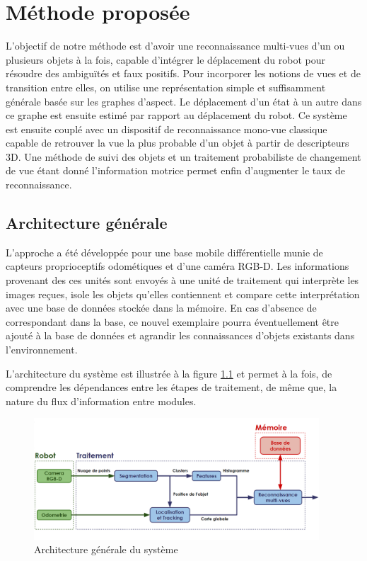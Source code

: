 
\chapter{Méthode proposée}

L'objectif de notre méthode est d'avoir une reconnaissance multi-vues d'un ou plusieurs objets à la fois, capable d'intégrer le déplacement du robot pour résoudre des ambiguïtés et faux positifs. Pour incorporer les notions de vues et de transition entre elles, on utilise une représentation simple et suffisamment générale basée sur les graphes d'aspect. Le déplacement d'un état à un autre dans ce graphe est ensuite estimé par rapport au déplacement du robot. Ce système est ensuite couplé avec un dispositif de reconnaissance mono-vue classique capable de retrouver la vue la plus probable d'un objet à partir de descripteurs 3D. Une méthode de suivi des objets et un traitement probabiliste de changement de vue étant donné l'information motrice permet enfin d'augmenter le taux de reconnaissance.

\section{Architecture générale}
L'approche a été développée pour une base mobile différentielle munie de capteurs proprioceptifs odométiques et d'une caméra RGB-D. Les informations provenant des ces unités sont envoyés à une unité de traitement qui interprète les images reçues, isole les objets qu'elles contiennent et compare cette interprétation avec une base de données stockée dans la mémoire. En cas d'absence de correspondant dans la base, ce nouvel exemplaire pourra éventuellement être ajouté à la base de données et agrandir les connaissances d'objets existants dans l'environnement.

L'architecture du système est illustrée à la figure \ref{fig:architecture} et permet à la fois, de comprendre les dépendances entre les étapes de traitement, de même que, la nature du flux d'information entre modules.

\begin{figure}[H]
  \centering
  \includegraphics[width=0.95\textwidth]{gen_arc.png}
  \caption{Architecture générale du système}
  \label{fig:architecture}
\end{figure}

